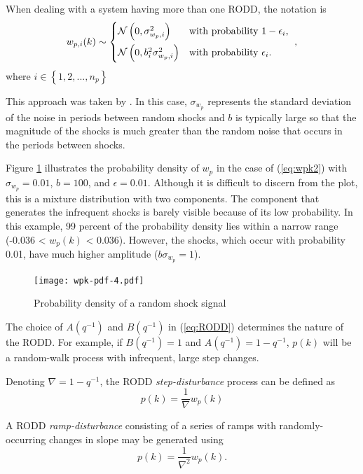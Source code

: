 When dealing with a system having more than one RODD, the notation is
\begin{equation} \label{eq:wpik2}
	w_{p,i}(k) \sim 
	\begin{cases*}
		\mathcal{N}\left(0, \sigma_{w_p,i}^2\right) & with probability $1-\epsilon_i$, \\
		\mathcal{N}\left(0, b_i^2\sigma_{w_p,i}^2\right) & with probability $\epsilon_i$.
	\end{cases*},
\end{equation}
where $i \in \left\{1, 2, ..., n_p\right\}$

This approach was taken by \cite{robertson_detection_1995}. In this case, $\sigma_{w_p}$ represents the standard deviation of the noise in periods between random shocks and $b$ is typically large so that the magnitude of the shocks is much greater than the random noise that occurs in the periods between shocks.

Figure \ref{fig:wpk-pdf} illustrates the probability density of $w_p$ in the case of (\ref{eq:wpk2}) with $\sigma_{w_p}=0.01$, $b=100$, and $\epsilon=0.01$. Although it is difficult to discern from the plot, this is a mixture distribution with two components. The component that generates the infrequent shocks is barely visible because of its low probability. In this example, 99 percent of the probability density lies within a narrow range (-0.036 < $w_p(k)$ < 0.036). However, the shocks, which occur with probability 0.01, have much higher amplitude ($b\sigma_{w_p}=1$).

\begin{figure}[htp]
	\centering
	\texttt{[image: wpk-pdf-4.pdf]}
	\caption{Probability density of a random shock signal}
	\label{fig:wpk-pdf}
\end{figure}

The choice of $A(q^{-1})$ and $B(q^{-1})$ in (\ref{eq:RODD}) determines the nature of the RODD. For example, if $B(q^{-1})=1$ and $A(q^{-1})=1-q^{-1}$, $p(k)$ will be a random-walk process with infrequent, large step changes.

Denoting $\nabla=1-q^{-1}$, the RODD \textit{step-disturbance} process can be defined as
\begin{equation} \label{eq:RODD-step}
	p(k)= \frac{1}{\nabla}w_p(k)
\end{equation}

A RODD \textit{ramp-disturbance} consisting of a series of ramps with randomly-occurring changes in slope may be generated using
\begin{equation} \label{eq:RODD-ramp}
	p(k)= \frac{1}{\nabla^2}w_p(k).
\end{equation}

